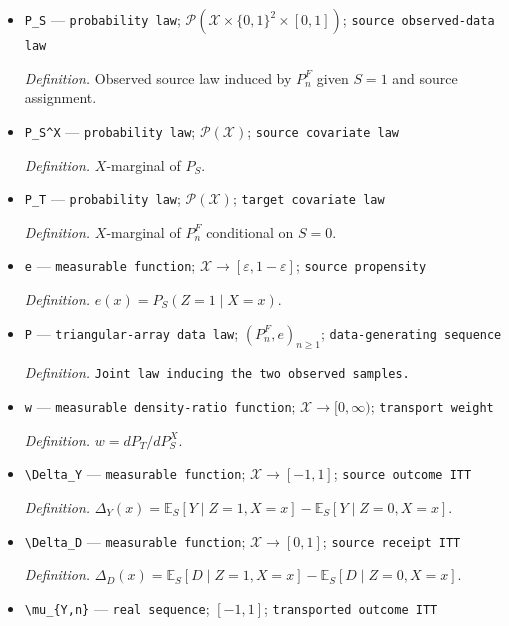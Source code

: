 \documentclass{article}
\begin{document}
\begin{itemize}
  \item \texttt{P\_\allowbreak{}S} --- \texttt{probability law}; \(\mathcal P(\mathcal X\times\{0,1\}^2\times[0,1])\); \texttt{source observed-\allowbreak{}data law}
  \par\smallskip\noindent\emph{Definition.} Observed source law induced by \(P_n^F\) given \(S=1\) and source assignment.
  \item \texttt{P\_\allowbreak{}S\textasciicircum{}X} --- \texttt{probability law}; \(\mathcal P(\mathcal X)\); \texttt{source covariate law}
  \par\smallskip\noindent\emph{Definition.} \(X\)-marginal of \(P_S\).
  \item \texttt{P\_\allowbreak{}T} --- \texttt{probability law}; \(\mathcal P(\mathcal X)\); \texttt{target covariate law}
  \par\smallskip\noindent\emph{Definition.} \(X\)-marginal of \(P_n^F\) conditional on \(S=0\).
  \item \texttt{e} --- \texttt{measurable function}; \(\mathcal X\to[\varepsilon,1-\varepsilon]\); \texttt{source propensity}
  \par\smallskip\noindent\emph{Definition.} \(e(x)=P_S(Z=1\mid X=x)\).
  \item \texttt{P} --- \texttt{triangular-\allowbreak{}array data law}; \((P_n^F,e)_{n\ge1}\); \texttt{data-\allowbreak{}generating sequence}
  \par\smallskip\noindent\emph{Definition.} \texttt{Joint law inducing the two observed samples.}
  \item \texttt{w} --- \texttt{measurable density-\allowbreak{}ratio function}; \(\mathcal X\to[0,\infty)\); \texttt{transport weight}
  \par\smallskip\noindent\emph{Definition.} \(w=dP_T/dP_S^X\).
  \item \texttt{\textbackslash{}\allowbreak{}Delta\_\allowbreak{}Y} --- \texttt{measurable function}; \(\mathcal X\to[-1,1]\); \texttt{source outcome ITT}
  \par\smallskip\noindent\emph{Definition.} \(\Delta_Y(x)=\mathbb E_S[Y\mid Z=1,X=x]-\mathbb E_S[Y\mid Z=0,X=x]\).
  \item \texttt{\textbackslash{}\allowbreak{}Delta\_\allowbreak{}D} --- \texttt{measurable function}; \(\mathcal X\to[0,1]\); \texttt{source receipt ITT}
  \par\smallskip\noindent\emph{Definition.} \(\Delta_D(x)=\mathbb E_S[D\mid Z=1,X=x]-\mathbb E_S[D\mid Z=0,X=x]\).
  \item \texttt{\textbackslash{}\allowbreak{}mu\_\allowbreak{}\{Y,\allowbreak{}n\}\allowbreak{}} --- \texttt{real sequence}; \([-1,1]\); \texttt{transported outcome ITT}

\end{itemize}
\end{document}
